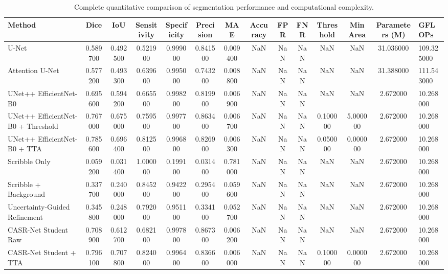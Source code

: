 \begin{table}
\caption{Complete quantitative comparison of segmentation performance and computational complexity.}
\label{tab:complete_metrics}
\begin{tabular}{lcccccccccccc}
\toprule
Method & Dice & IoU & Sensitivity & Specificity & Precision & MAE & Accuracy & FPR & FNR & Threshold & Min Area & Parameters (M) & GFLOPs \\
\midrule
U-Net & 0.589700 & 0.492500 & 0.521900 & 0.999000 & 0.841500 & 0.009400 & NaN & NaN & NaN & NaN & NaN & 31.036000 & 109.325000 \\
Attention U-Net & 0.577200 & 0.493300 & 0.639600 & 0.995000 & 0.743200 & 0.008800 & NaN & NaN & NaN & NaN & NaN & 31.388000 & 111.543000 \\
UNet++ EfficientNet-B0 & 0.695600 & 0.594200 & 0.665500 & 0.998200 & 0.819900 & 0.006900 & NaN & NaN & NaN & NaN & NaN & 2.672000 & 10.268000 \\
UNet++ EfficientNet-B0 + Threshold & 0.767000 & 0.675000 & 0.759500 & 0.997700 & 0.863400 & 0.006700 & NaN & NaN & NaN & 0.100000 & 5.000000 & 2.672000 & 10.268000 \\
UNet++ EfficientNet-B0 + TTA & 0.785600 & 0.696400 & 0.812500 & 0.996800 & 0.826900 & 0.006300 & NaN & NaN & NaN & 0.050000 & 0.000000 & 2.672000 & 10.268000 \\
Scribble Only & 0.059200 & 0.031400 & 1.000000 & 0.199100 & 0.031400 & 0.781000 & NaN & NaN & NaN & NaN & NaN & 2.672000 & 10.268000 \\
Scribble + Background & 0.337700 & 0.240000 & 0.845200 & 0.942200 & 0.295400 & 0.059600 & NaN & NaN & NaN & NaN & NaN & 2.672000 & 10.268000 \\
Uncertainty-Guided Refinement & 0.345800 & 0.248000 & 0.792000 & 0.951100 & 0.334100 & 0.052700 & NaN & NaN & NaN & NaN & NaN & 2.672000 & 10.268000 \\
CASR-Net Student Raw & 0.708900 & 0.612700 & 0.682100 & 0.997800 & 0.867300 & 0.006200 & NaN & NaN & NaN & NaN & NaN & 2.672000 & 10.268000 \\
CASR-Net Student + TTA & 0.796100 & 0.707800 & 0.824000 & 0.996400 & 0.836600 & 0.006000 & NaN & NaN & NaN & 0.100000 & 0.000000 & 2.672000 & 10.268000 \\
\bottomrule
\end{tabular}
\end{table}
